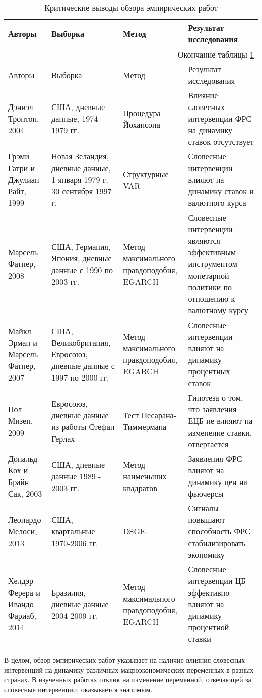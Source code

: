 \documentclass[14pt,a4paper, oneside]{extreport}
\begin{document}
\begin{longtable}{|m{2.5cm}|m{3.5cm}|m{2.5cm}|m{6cm}|}
	\caption{Критические выводы обзора эмпирических работ}\label{tab1}\\
	\hline
	Авторы & Выборка & Метод & Результат исследования \\ 
	\endfirsthead
	\multicolumn{4}{r}{Окончание таблицы \ref{tab1}}\\\hline
	Авторы & Выборка & Метод & Результат исследования \\ \hline
	\endhead
	\hline
	\endfoot
	\hline
	\endlastfoot
\hline
  		Дэниэл Тронтон, 2004 & США, дневные данные, 1974-1979 гг. & Процедура Йохансона & Влияние словесных интервенции ФРС на динамику ставок отсутствует  \\
  		\hline
  		Грэми Гатри и Джулиан Райт, 1999 & Новая Зеландия, дневные данные, 1 января 1979 г. - 30 сентября 1997 г.& Структурные VAR & Словесные интервенции влияют на динамику ставок и валютного курса  \\ 
  		\hline
  		Марсель Фатнер, 2008 & США, Германия, Япония, дневные данные с 1990 по 2003 гг.  & Метод максимального правдоподобия, EGARCH & Словесные интервенции являются эффективным инструментом монетарной политики по отношению к валютному курсу \\ 
  		\hline
  		Майкл Эрман и Марсель Фатнер, 2007 & США, Великобритания, Евросоюз, дневные данные с 1997 по 2000 гг. & Метод максимального правдоподобия, EGARCH & Словесные интервенции влияют на динамику процентных ставок \\ 
  		\hline
  		Пол Мизен, 2009 & Евросоюз, дневные данные из работы Стефан Герлах & Тест Песарана-Тиммермана & Гипотеза о том, что заявления ЕЦБ не влияют на изменение ставки, отвергается  \\
  		\hline
  		Дональд Кох и Брайн Сак, 2003 & США, дневные данные 1989 - 2003 гг. & Метод наименьших квадратов & Заявления ФРС влияют на динамику цен на фьючерсы  \\
  		\hline
  		Леонардо Мелоси, 2013 & США, квартальные 1970-2006 гг. & DSGE & Сигналы повышают способность ФРС стабилизировать экономику  \\
  		\hline
  		Хелдэр Ферера и Ивандо Фариаб, 2014 & Бразилия, дневные данные 2004-2009 гг. &Метод максимального правдоподобия, EGARCH& Словесные интервенции ЦБ эффективно влияют на динамику процентной ставки \\
  		\hline
\end{longtable}

В целом, обзор эмпирических работ указывает на наличие влияния словесных интервенций на динамику различных макроэкономических переменных в разных  странах. В изученных работах отклик на изменение переменной, отвечающей за словесные интервенции, оказывается значимым. 
\end{document}
